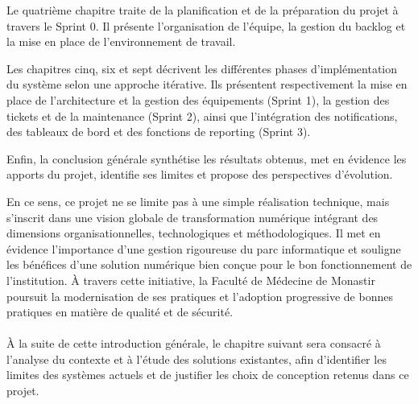 Le quatrième chapitre traite de la planification et de la préparation du projet à travers le Sprint 0. Il présente l’organisation de l’équipe, la gestion du backlog et la mise en place de l’environnement de travail.

Les chapitres cinq, six et sept décrivent les différentes phases d’implémentation du système selon une approche itérative. Ils présentent respectivement la mise en place de l’architecture et la gestion des équipements (Sprint 1), la gestion des tickets et de la maintenance (Sprint 2), ainsi que l’intégration des notifications, des tableaux de bord et des fonctions de reporting (Sprint 3).

Enfin, la conclusion générale synthétise les résultats obtenus, met en évidence les apports du projet, identifie ses limites et propose des perspectives d’évolution.

En ce sens, ce projet ne se limite pas à une simple réalisation technique, mais s’inscrit dans une vision globale de transformation numérique intégrant des dimensions organisationnelles, technologiques et méthodologiques. Il met en évidence l’importance d’une gestion rigoureuse du parc informatique et souligne les bénéfices d’une solution numérique bien conçue pour le bon fonctionnement de l’institution. À travers cette initiative, la Faculté de Médecine de Monastir poursuit la modernisation de ses pratiques et l’adoption progressive de bonnes pratiques en matière de qualité et de sécurité.

\paragraph{}
À la suite de cette introduction générale, le chapitre suivant sera consacré à l’analyse du contexte et à l’étude des solutions existantes, afin d’identifier les limites des systèmes actuels et de justifier les choix de conception retenus dans ce projet.
